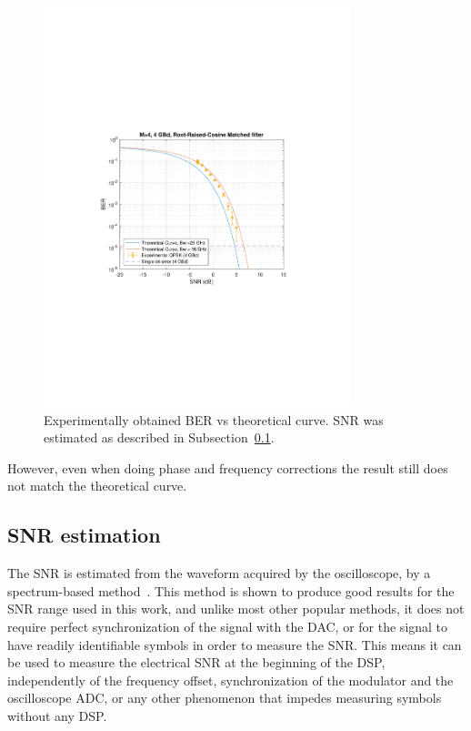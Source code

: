 \begin{refsection}
\begin{figure}[H]
	\centering
	\includegraphics[clip, trim=4cm 8cm 4cm 8cm,
	width=0.8\textwidth]{./sdf/m_qam_system/figures/expResults/homodyne/4GBdBER20180611.pdf}
	\caption{Experimentally obtained BER vs theoretical curve. SNR was estimated as described in Subsection~\ref{ssc:snrEst}.}
	\label{fig:4GBdFinalBERcurveHm}
\end{figure}

However, even when doing phase and frequency corrections the result still does not match the theoretical curve.

\subsection{SNR estimation}
\label{ssc:snrEst}
The SNR is estimated from the waveform acquired by the oscilloscope, by a 
spectrum-based method~\cite{xiao10,kashefi12}. This method is shown to produce 
good results for the SNR range used in this work, and unlike most other popular 
methods, it does not require perfect synchronization of the signal with the 
DAC, or for the signal to have readily identifiable symbols in order to measure 
the SNR. This means it can be used to measure the electrical SNR at the 
beginning of the DSP, independently of the frequency offset, synchronization of 
the modulator and the oscilloscope ADC, or any other phenomenon that impedes 
measuring symbols without any DSP.


\end{refsection}
